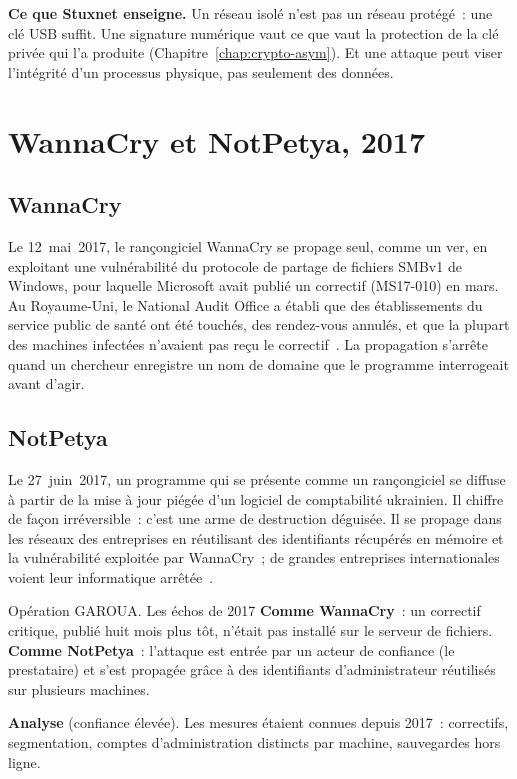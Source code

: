 \begin{boxinfo}
\textbf{Ce que Stuxnet enseigne.} Un réseau isolé n'est pas un réseau
protégé~: une clé USB suffit. Une signature numérique vaut ce que vaut la
protection de la clé privée qui l'a produite (Chapitre~\ref{chap:crypto-asym}).
Et une attaque peut viser l'intégrité d'un processus physique, pas
seulement des données.
\end{boxinfo}

\section{WannaCry et NotPetya, 2017}
\label{sec:c05-2017}

\subsection{WannaCry}

Le 12~mai~2017, le rançongiciel WannaCry se propage seul, comme un ver, en
exploitant une vulnérabilité du protocole de partage de fichiers SMBv1 de
Windows, pour laquelle Microsoft avait publié un correctif (MS17-010) en
mars. Au Royaume-Uni, le National Audit Office a établi que des
établissements du service public de santé ont été touchés, des rendez-vous
annulés, et que la plupart des machines infectées n'avaient pas reçu le
correctif~\cite{nao2017wannacry}. La propagation s'arrête quand un
chercheur enregistre un nom de domaine que le programme interrogeait avant
d'agir.

\subsection{NotPetya}

Le 27~juin~2017, un programme qui se présente comme un rançongiciel se
diffuse à partir de la mise à jour piégée d'un logiciel de comptabilité
ukrainien. Il chiffre de façon irréversible~: c'est une arme de
destruction déguisée. Il se propage dans les réseaux des entreprises en
réutilisant des identifiants récupérés en mémoire et la vulnérabilité
exploitée par WannaCry~; de grandes entreprises internationales voient
leur informatique arrêtée~\cite{greenberg2019}.

\begin{boxscenario}{Opération GAROUA. Les échos de 2017}
\textbf{Comme WannaCry}~: un correctif critique, publié huit mois plus
tôt, n'était pas installé sur le serveur de fichiers. \textbf{Comme
NotPetya}~: l'attaque est entrée par un acteur de confiance (le
prestataire) et s'est propagée grâce à des identifiants d'administrateur
réutilisés sur plusieurs machines.

\medskip
\textbf{Analyse} (confiance élevée). Les mesures étaient connues depuis
2017~: correctifs, segmentation, comptes d'administration distincts par
machine, sauvegardes hors ligne.
\end{boxscenario}

